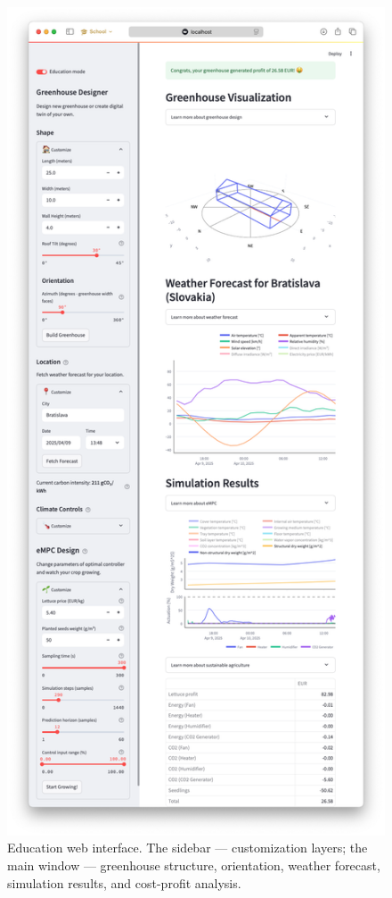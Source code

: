 \documentclass[conference]{IEEEtran}
\begin{document}
\begin{figure}\label{fig:web}
    \centering
    \includegraphics[width=\linewidth, trim=50 50 50 50]{figures/webpage.png}
    \caption{Education web interface. The sidebar ---  customization layers; the main window --- greenhouse structure, orientation, weather forecast, simulation results, and cost-profit analysis.}
\end{figure}
\end{document}
